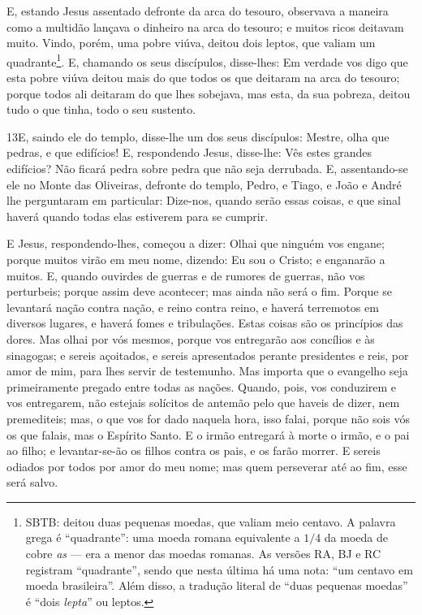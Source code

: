 E, estando Jesus assentado defronte da arca do tesouro, observava
a maneira como a multidão lançava o dinheiro na arca do tesouro; e
muitos ricos deitavam muito. Vindo, porém, uma pobre viúva,
deitou dois leptos, que valiam um quadrante\footnote{SBTB: deitou
duas pequenas moedas, que valiam meio centavo. A palavra grega é
``quadrante'': uma moeda romana equivalente a $1/4$ da moeda de
cobre \emph{as} --- era a menor das moedas romanas. As versões RA,
BJ e RC registram ``quadrante'', sendo que nesta última há uma nota:
``um centavo em moeda brasileira''. Além disso, a tradução literal
de ``duas pequenas moedas'' é ``dois \emph{lepta}'' ou leptos.}.
E, chamando os seus discípulos, disse-lhes: Em verdade vos
digo que esta pobre viúva deitou mais do que todos os que deitaram
na arca do tesouro; porque todos ali deitaram do que lhes
sobejava, mas esta, da sua pobreza, deitou tudo o que tinha, todo o
seu sustento.

\medskip

\lettrine{13} E, saindo ele do templo, disse-lhe um dos seus
discípulos: Mestre, olha que pedras, e que edifícios! E,
respondendo Jesus, disse-lhe: Vês estes grandes edifícios? Não
ficará pedra sobre pedra que não seja derrubada. E,
assentando-se ele no Monte das Oliveiras, defronte do templo, Pedro,
e Tiago, e João e André lhe perguntaram em particular: Dize-nos,
quando serão essas coisas, e que sinal haverá quando todas elas
estiverem para se cumprir.

E Jesus, respondendo-lhes, começou a dizer: Olhai que ninguém vos
engane; porque muitos virão em meu nome, dizendo: Eu sou o
Cristo; e enganarão a muitos. E, quando ouvirdes de guerras e de
rumores de guerras, não vos perturbeis; porque assim deve acontecer;
mas ainda não será o fim. Porque se levantará nação contra
nação, e reino contra reino, e haverá terremotos em diversos
lugares, e haverá fomes e tribulações. Estas coisas são os
princípios das dores. Mas olhai por vós mesmos, porque vos
entregarão aos concílios e às sinagogas; e sereis açoitados, e
sereis apresentados perante presidentes e reis, por amor de mim,
para lhes servir de testemunho. Mas importa que o evangelho
seja primeiramente pregado entre todas as nações. Quando,
pois, vos conduzirem e vos entregarem, não estejais solícitos de
antemão pelo que haveis de dizer, nem premediteis; mas, o que vos
for dado naquela hora, isso falai, porque não sois vós os que
falais, mas o Espírito Santo. E o irmão entregará à morte o
irmão, e o pai ao filho; e levantar-se-ão os filhos contra os pais,
e os farão morrer. E sereis odiados por todos por amor do meu
nome; mas quem perseverar até ao fim, esse será salvo.

